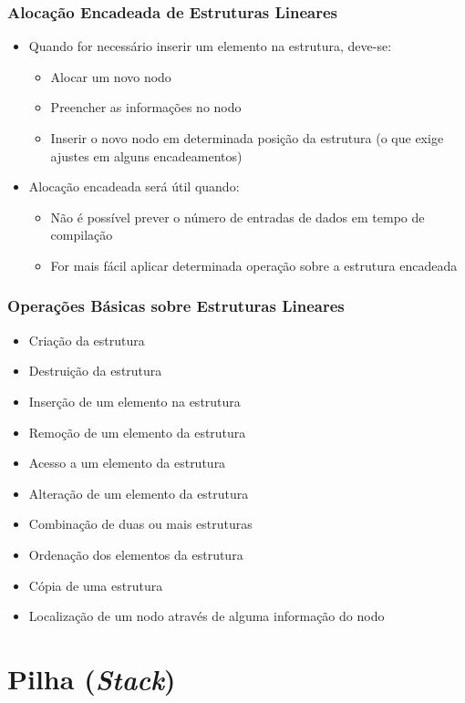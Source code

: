 \documentclass[aspectratio=169]{beamer}
\begin{document}
\begin{frame}\frametitle{Alocação Encadeada de Estruturas Lineares}
\begin{itemize}
	\item Quando for necessário inserir um elemento na estrutura, deve-se:
	\begin{itemize}
		\item Alocar um novo nodo
		\item Preencher as informações no nodo
		\item Inserir o novo nodo em determinada posição da estrutura (o que exige ajustes em alguns encadeamentos)
	\end{itemize}
	\item Alocação encadeada será útil quando:
	\begin{itemize}
		\item Não é possível prever o número de entradas de dados em tempo de compilação
		\item For mais fácil aplicar determinada operação sobre a estrutura encadeada
	\end{itemize}
\end{itemize}
\end{frame}

\begin{frame}\frametitle{Operações Básicas sobre Estruturas Lineares}
\begin{itemize}
	\item Criação da estrutura
	\item Destruição da estrutura
	\item Inserção de um elemento na estrutura
	\item Remoção de um elemento da estrutura
	\item Acesso a um elemento da estrutura
	\item Alteração de um elemento da estrutura
	\item Combinação de duas ou mais estruturas
	\item Ordenação dos elementos da estrutura
	\item Cópia de uma estrutura
	\item Localização de um nodo através de alguma informação do nodo
\end{itemize}
\end{frame}

\section{Pilha (\emph{Stack})}
\end{document}
